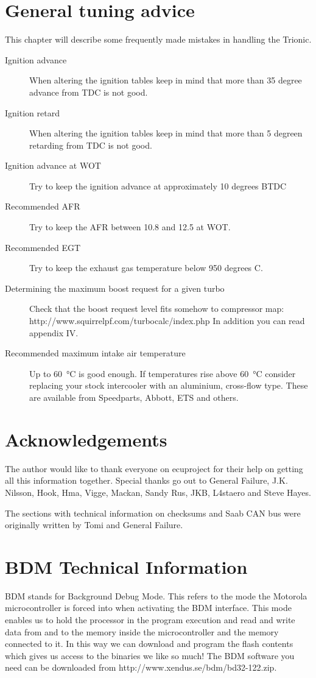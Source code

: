 \documentclass[11pt,a4paper]{book}
\begin{document}
\chapter{General tuning advice}
This chapter will describe some frequently made mistakes in handling the Trionic.
\begin{description}
    \item[Ignition advance]
        When altering the ignition tables keep in mind that more than 35 degree advance from TDC is not good.
    \item[Ignition retard]
        When altering the ignition tables keep in mind that more than 5 degreen retarding from TDC is not good.
    \item[Ignition advance at WOT] Try to keep the ignition advance at
        approximately 10 degrees BTDC
    \item[Recommended AFR] Try to keep the AFR between 10.8 and 12.5 at WOT.
    \item[Recommended EGT] Try to keep the exhaust gas temperature below 950
        degrees C.
    \item[Determining the maximum boost request for a given turbo] Check that the boost request level fits somehow to compressor map:
        http://www.squirrelpf.com/turbocalc/index.php
        In addition you can read appendix IV.
    \item[Recommended maximum intake air temperature] Up to
        \SI{60}{\celsius} is good enough. If temperatures rise above
        \SI{60}{\celsius} consider replacing your stock
        intercooler with an aluminium, cross-flow type. These are available from Speedparts, Abbott, ETS and
        others.
\end{description}

\chapter{Acknowledgements}
The author would like to thank everyone on ecuproject for their help on getting
all this information together. Special thanks go out to General Failure, J.K.
Nilsson, Hook, Hma, Vigge, Mackan, Sandy Rus, JKB, L4staero and Steve Hayes.

The sections with technical information on checksums and Saab CAN bus were originally
written by Tomi and General Failure.



\appendix
\chapter{BDM Technical Information}
BDM stands for Background Debug Mode. This refers to the mode the Motorola microcontroller is
forced into when activating the BDM interface. This mode enables us to hold the processor in the
program execution and read and write data from and to the memory inside the microcontroller and
the memory connected to it. In this way we can download and program the flash contents which gives
us access to the binaries we like so much! The BDM software you need can be downloaded from
http://www.xendus.se/bdm/bd32-122.zip.
\end{document}
